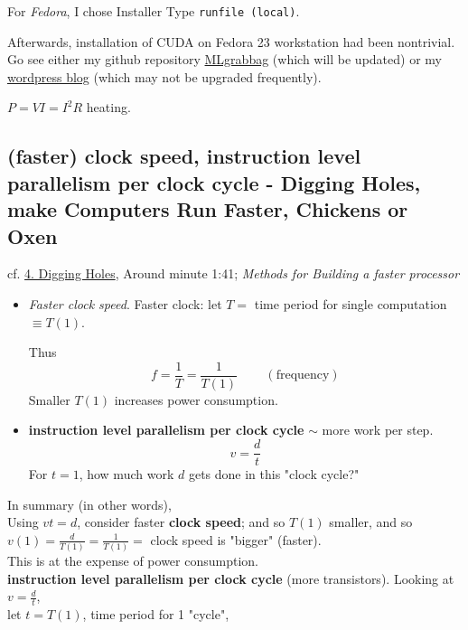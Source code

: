 \documentclass[10pt]{amsart}
\begin{document}
\begin{multicols*}{2}
For \emph{Fedora}, I chose Installer Type \verb|runfile (local)|.  

Afterwards, installation of CUDA on Fedora 23 workstation had been nontrivial.  Go see either my github repository \href{https://github.com/ernestyalumni/MLgrabbag/blob/master/README.md}{MLgrabbag} (which will be updated) or my \href{https://ernestyalumni.wordpress.com/2016/05/07/fedora-23-workstation-linuxnvidia-geforce-gtx-980-ti-my-experience-log-of-what-i-do-and-find-out/#CUDAinstall}{wordpress blog} (which may not be upgraded frequently).  


$P=VI = I^2R$ heating.

\subsection{(faster) clock speed, instruction level parallelism per clock cycle - Digging Holes, make Computers Run Faster, Chickens or Oxen}

cf. \href{https://classroom.udacity.com/courses/cs344/lessons/55120467/concepts/658883610923}{4. Digging Holes}, 
Around minute 1:41; \emph{Methods for Building a faster processor} 
\begin{itemize}
\item \emph{Faster clock speed}.  Faster clock: let $T =$ time period for single computation $\equiv T(1)$.  

Thus 
\[
f = \frac{1}{T} = \frac{1}{T(1)} \qquad \, (\text{frequency})
\]  
Smaller $T(1)$ increases power consumption.  
\item \textbf{instruction level parallelism per clock cycle} $\sim$ more work per step.  
\[
v = \frac{d}{t}
\]
For $t=1$, how much work $d$ gets done in this "clock cycle?"
\end{itemize}

In summary (in other words), \\

Using $vt=d$, consider faster \textbf{clock speed}; and so $T(1)$ smaller, and so $v(1) = \frac{d}{T(1)} = \frac{1}{ T(1)} = $ clock speed is "bigger" (faster).  \\

This is at the expense of power consumption.  \\

\textbf{instruction level parallelism per clock cycle} (more transistors).  Looking at $v=\frac{d}{t}$, \\

let $t=T(1)$, time period for 1 "cycle", \\


\end{multicols*}
\end{document}
